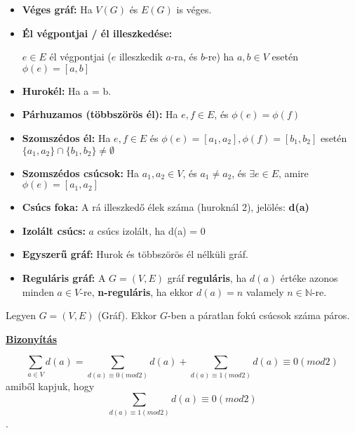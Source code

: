 \documentclass[10pt]{article}
\renewcommand{\\}{\par\noindent}
\begin{document}
\begin{frame}

\begin{tcolorbox}[title={Egyéb definíciók}]
\begin{itemize}
\item \textbf{Véges gráf:} Ha $V(G)$ és $E(G)$ is véges.
\item \textbf{Él végpontjai / él illeszkedése:}\\
$e \in E$ él végpontjai ($e$ illeszkedik $a$-ra, és $b$-re) ha $a, b \in V$ esetén ${\phi}(e) = [a, b]$
\item \textbf{Hurokél:} Ha a = b.
\item \textbf{Párhuzamos (többszörös él):} Ha $e, f \in E$, és ${\phi}(e) = {\phi}(f)$
\item \textbf{Szomszédos él:} Ha $e, f \in E$ és ${\phi}(e) = [a_1, a_2], {\phi}(f) = [b_1, b_2]$ esetén $\{a_1, a_2\} \cap \{b_1, b_2\} \neq \emptyset$
\item \textbf{Szomszédos csúcsok:} Ha $a_1, a_2 \in V$, és $a_1 \neq a_2$, és ${\exists}e \in E$, amire ${\phi}(e) = [a_1, a_2]$
\item \textbf{Csúcs foka:} A rá illeszkedő élek száma (huroknál 2), jelölés: \textbf{d(a)}
\item \textbf{Izolált csúcs:} $a$ csúcs izolált, ha d(a) = 0
\item \textbf{Egyszerű gráf:} Hurok és többszörös él nélküli gráf.
\item \textbf{Reguláris gráf:} A $G = (V, E)$ gráf \textbf{reguláris}, ha $d(a)$ értéke azonos minden $a \in V$-re, \textbf{n-reguláris}, ha ekkor $d(a) = n$ valamely $n \in \mathbb{N}$-re.
\end{itemize}
\end{tcolorbox}

\end{frame}

\begin{frame}

\begin{tcolorbox}[title={Tétel: Fokszám-Élszám}]
Legyen $G = (V, E)$ (Gráf). Ekkor $G$-ben a páratlan fokú csúcsok száma páros.\\
\tcblower
\smallskip
\underline{\textbf{Bizonyítás}}\\
\medskip
\\
$$\sum_{a \in V} d(a) = \sum_{d(a) \equiv 0 (mod 2)} d(a) + \sum_{d(a) \equiv 1 (mod 2)} d(a) \equiv 0 (mod 2)$$
amiből kapjuk, hogy $$\sum_{d(a) \equiv 1 (mod 2)} d(a) \equiv 0 (mod 2)$$.

\end{tcolorbox}

\end{frame}
\end{document}
